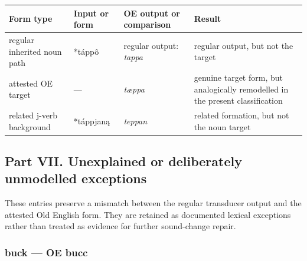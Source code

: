 \documentclass[
  british,
  a4paper,
]{article}
\newcounter{none} %
\begin{document}
{\def\LTcaptype{none} %
\begin{longtable}[]{@{}
  >{\raggedright\arraybackslash}p{}
  >{\raggedright\arraybackslash}p{}
  >{\raggedright\arraybackslash}p{}
  >{\raggedright\arraybackslash}p{}@{}}
\toprule\noalign{}
\begin{minipage}[b]{\linewidth}\raggedright
Form type
\end{minipage} & \begin{minipage}[b]{\linewidth}\raggedright
Input or form
\end{minipage} & \begin{minipage}[b]{\linewidth}\raggedright
OE output or comparison
\end{minipage} & \begin{minipage}[b]{\linewidth}\raggedright
Result
\end{minipage} \\
\midrule\noalign{}
\endhead
\bottomrule\noalign{}
\endlastfoot
regular inherited noun path & *táppô & regular output: \emph{tappa} &
regular output, but not the target \\
attested OE target & --- & \emph{tæppa} & genuine target form, but
analogically remodelled in the present classification \\
related j-verb background & *táppjaną & \emph{teppan} & related
formation, but not the noun target \\
\end{longtable}
}

\clearpage

\subsection{Part VII. Unexplained or deliberately unmodelled
exceptions}\label{part-vii.-unexplained-or-deliberately-unmodelled-exceptions}

These entries preserve a mismatch between the regular transducer output
and the attested Old English form. They are retained as documented
lexical exceptions rather than treated as evidence for further
sound-change repair.

\subsubsection{buck --- OE bucc}\label{buck-oe-bucc}
\end{document}
